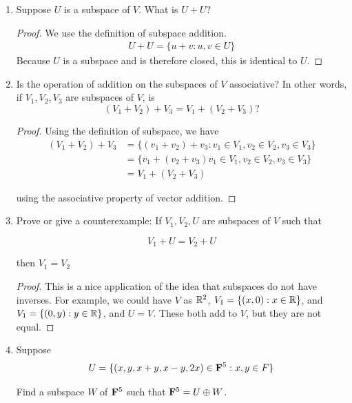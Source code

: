 \begin{enumerate}
    \item[15] Suppose $U$ is a subspace of $V$. What is $U + U$?
    \begin{proof}
        We use the definition of subspace addition. 
        \begin{align*}
            U + U = \{u + v: u, v \in U\}
        \end{align*}
        Because $U$ is a subspace and is therefore closed, this is identical to $U$. 
    \end{proof}

    \item[17] Is the operation of addition on the subspaces of $V$ associative? In other words, if
    $V_1, V_2, V_3$ are subspaces of $V$, is
    \[
        (V_1 + V_2) + V_3 = V_1 + (V_2 + V_3)?
    \]

    \begin{proof}
        Using the definition of subspace, we have 
        \begin{align*}
            (V_1 + V_2) + V_3 &= \{(v_1 + v_2) + v_3: v_1 \in V_1, v_2 \in V_2, v_3 \in V_3\} \\
            &= \{v_1 + (v_2 + v_3) v_1 \in V_1, v_2 \in V_2, v_3 \in V_3\} \\
            &= V_1 + (V_2 + V_3) 
        \end{align*}

        using the associative property of vector addition.
    \end{proof}

    \item[19] Prove or give a counterexample: If $V_1, V_2, U$ are subspaces of $V$ such that 
    
    \[V_1 + U = V_2 + U\]

    then $V_1 = V_2$

    \begin{proof}
        This is a nice application of the idea that subspaces do not have inverses. For example, we could have $V$ as $\mathbb{R}^2$, $V_1 = \{(x, 0): x \in \mathbb{R}\}$, and $V_1 = \{(0, y): y \in \mathbb{R}\}$, and $U = V$. These both add to $V$, but they are not equal.
    \end{proof}
    
    \item[21]
    
    Suppose 
    \[U = \{(x, y, x + y, x - y, 2x) \in \bold F^5: x, y \in F\}\]

    Find a subspace $W$ of $\bold F^5$ such that $\bold F^5 = U \oplus W$.


\end{enumerate}
